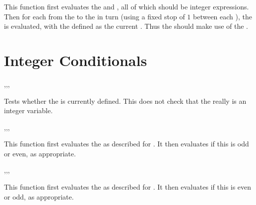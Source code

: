 \documentclass[oneside]{book}
\begin{document}
\begin{function}{\intStepOneVariable}
\begin{syntax}
    
\end{syntax}
This function first evaluates the  and ,
all of which should be integer expressions.
Then for each  from the  to the
 in turn (using a fixed stop of $1$ between each
), the  is evaluated,
with the  defined as the current . Thus
the  should make use of the .
\end{function}

\section{Integer Conditionals}

\begin{function}{\intIfExist,\intIfExistT,\intIfExistF,\intIfExistTF}
\begin{syntax}
 
  
  
   
\end{syntax}
Tests whether the  is currently defined.  This does not
check that the  really is an integer variable.
\end{function}

\begin{function}{\intIfOdd,\intIfOddT,\intIfOddF,\intIfOddTF}
\begin{syntax}
 
  
  
   
\end{syntax}
This function first evaluates the 
as described for .
It then evaluates if this is odd or even, as appropriate.
\end{function}

\begin{function}{\intIfEven,\intIfEvenT,\intIfEvenF,\intIfEvenTF}
\begin{syntax}
 
  
  
   
\end{syntax}
This function first evaluates the 
as described for .
It then evaluates if this is even or odd, as appropriate.
\end{function}
\end{document}
